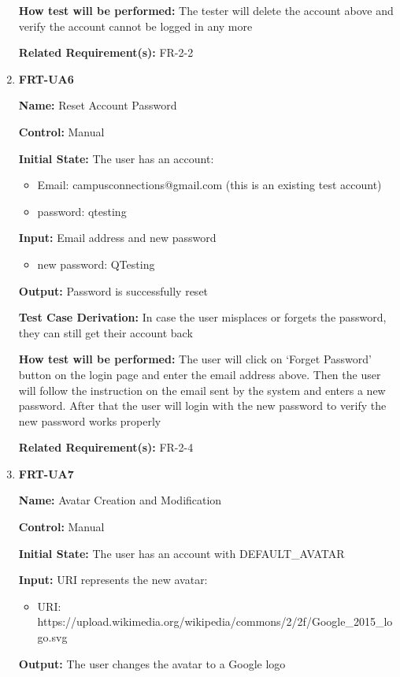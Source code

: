 \documentclass[12pt, titlepage]{article}
\begin{document}
\begin{enumerate}
\textbf{How test will be performed:} The tester will delete the account above and verify the account cannot be logged in any more

\textbf{Related Requirement(s):} FR-2-2

\item{\textbf{FRT-UA6}}

\textbf{Name:} Reset Account Password

\textbf{Control:} Manual
					
\textbf{Initial State:} The user has an account:
\begin{itemize}
\item Email: campusconnections@gmail.com (this is an existing test account)
\item password: qtesting
\end{itemize}

\textbf{Input:} Email address and new password
\begin{itemize}
\item new password: QTesting
\end{itemize}
					
\textbf{Output:} Password is successfully reset

\textbf{Test Case Derivation:} In case the user misplaces or forgets the password, they can still get their account back
					
\textbf{How test will be performed:} The user will click on `Forget Password' button on the login page and enter the email address above. Then the user will follow the instruction on the email sent by the system and enters a new password. After that the user will login with the new password to verify the new password works properly

\textbf{Related Requirement(s):} FR-2-4

\item{\textbf{FRT-UA7}}

\textbf{Name:} Avatar Creation and Modification

\textbf{Control:} Manual
					
\textbf{Initial State:} The user has an account with DEFAULT\_AVATAR

\textbf{Input:} URI represents the new avatar:
\begin{itemize}
\item URI: https://upload.wikimedia.org/wikipedia/commons/2/2f/Google\_2015\_logo.svg
\end{itemize}
					
\textbf{Output:} The user changes the avatar to a Google logo


\end{enumerate}
\end{document}
